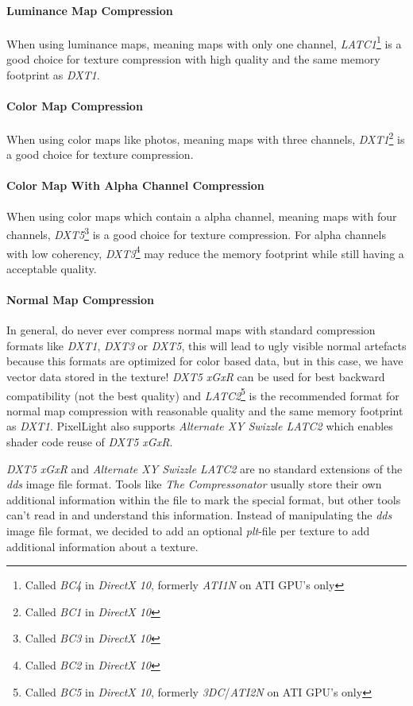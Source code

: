 \paragraph{Luminance Map Compression}
When using luminance maps, meaning maps with only one channel, \emph{LATC1}\footnote{Called \emph{BC4} in \emph{DirectX 10}, formerly \emph{ATI1N} on ATI GPU's only} is a good choice for texture compression with high quality and the same memory footprint as \emph{DXT1}.


\paragraph{Color Map Compression}
When using color maps like photos, meaning maps with three channels, \emph{DXT1}\footnote{Called \emph{BC1} in \emph{DirectX 10}} is a good choice for texture compression.


\paragraph{Color Map With Alpha Channel Compression}
When using color maps which contain a alpha channel, meaning maps with four channels, \emph{DXT5}\footnote{Called \emph{BC3} in \emph{DirectX 10}} is a good choice for texture compression. For alpha channels with low coherency, \emph{DXT3}\footnote{Called \emph{BC2} in \emph{DirectX 10}} may reduce the memory footprint while still having a acceptable quality.


\paragraph{Normal Map Compression}
In general, do never ever compress normal maps with standard compression formats like \emph{DXT1}, \emph{DXT3} or \emph{DXT5}, this will lead to ugly visible normal artefacts because this formats are optimized for color based data, but in this case, we have vector data stored in the texture! \emph{DXT5 xGxR} can be used for best backward compatibility (not the best quality) and \emph{LATC2}\footnote{Called \emph{BC5} in \emph{DirectX 10}, formerly \emph{3DC}/\emph{ATI2N} on ATI GPU's only} is the recommended format for normal map compression with reasonable quality and the same memory footprint as \emph{DXT1}. PixelLight also supports \emph{Alternate XY Swizzle LATC2} which enables shader code reuse of \emph{DXT5 xGxR}.

\emph{DXT5 xGxR} and \emph{Alternate XY Swizzle LATC2} are no standard extensions of the \emph{dds} image file format. Tools like \emph{The Compressonator} usually store their own additional information within the file to mark the special format, but other tools can't read in and understand this information. Instead of manipulating the \emph{dds} image file format, we decided to add an optional \emph{plt}-file per texture to add additional information about a texture.

